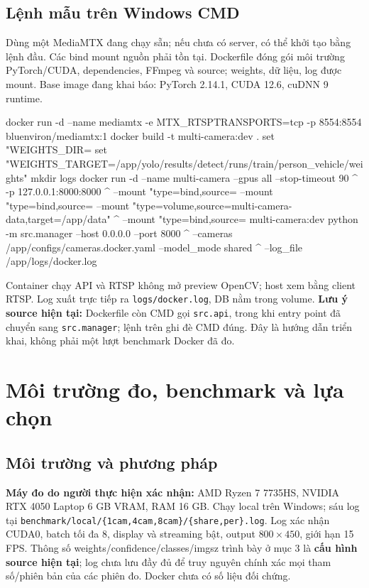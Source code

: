 \documentclass[10pt,a4paper]{article}
\begin{document}
\subsection*{Lệnh mẫu trên Windows CMD}
Dùng một MediaMTX đang chạy sẵn; nếu chưa có server, có thể khởi tạo bằng
lệnh đầu. Các bind mount nguồn phải tồn tại. Dockerfile đóng gói môi trường
PyTorch/CUDA, dependencies, FFmpeg và source; weights, dữ liệu, log được mount.
Base image đang khai báo: PyTorch 2.14.1, CUDA 12.6, cuDNN 9 runtime.
\begin{Code}
docker run -d --name mediamtx -e MTX_RTSPTRANSPORTS=tcp -p 8554:8554 bluenviron/mediamtx:1
docker build -t multi-camera:dev .
set "WEIGHTS_DIR=%
set "WEIGHTS_TARGET=/app/yolo/results/detect/runs/train/person_vehicle/weights"
mkdir logs
docker run -d --name multi-camera --gpus all --stop-timeout 90 ^
  -p 127.0.0.1:8000:8000 ^
  --mount "type=bind,source=%
  --mount "type=bind,source=%
  --mount "type=volume,source=multi-camera-data,target=/app/data" ^
  --mount "type=bind,source=%
  multi-camera:dev python -m src.manager --host 0.0.0.0 --port 8000 ^
  --cameras /app/configs/cameras.docker.yaml --model_mode shared ^
  --log_file /app/logs/docker.log
\end{Code}
Container chạy API và RTSP không mở preview OpenCV; host xem bằng client RTSP.
Log xuất trực tiếp ra \texttt{logs/docker.log}, DB nằm trong volume.
\textbf{Lưu ý source hiện tại:} Dockerfile còn CMD gọi \texttt{src.api}, trong khi
entry point đã chuyển sang \texttt{src.manager}; lệnh trên ghi đè CMD đúng.
Đây là hướng dẫn triển khai, không phải một lượt benchmark Docker đã đo.

\newpage
\section{Môi trường đo, benchmark và lựa chọn}
\subsection*{Môi trường và phương pháp}
\textbf{Máy đo do người thực hiện xác nhận:} AMD Ryzen 7 7735HS,
NVIDIA RTX 4050 Laptop 6 GB VRAM, RAM 16 GB.
Chạy local trên Windows; sáu log tại
\texttt{benchmark/local/\{1cam,4cam,8cam\}/\{share,per\}.log}.
Log xác nhận CUDA0, batch tối đa 8, display và streaming bật,
output $800\times450$, giới hạn 15 FPS.
Thông số weights/confidence/classes/imgsz trình bày ở mục 3 là
\textbf{cấu hình source hiện tại}; log chưa lưu đầy đủ để truy nguyên chính
xác mọi tham số/phiên bản của các phiên đo. Docker chưa có số liệu đối chứng.
\end{document}
